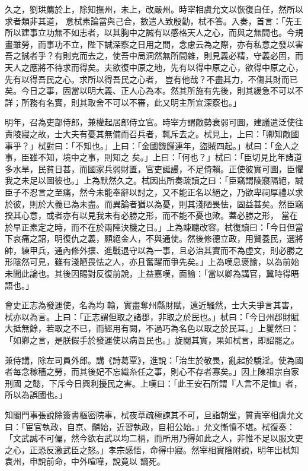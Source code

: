 \begin{pinyinscope}
 久之，劉珙薦於上，除知撫州，未上，改嚴州。時宰相虞允文以恢復自任，然所以求者類非其道，
 意栻素論當與己合，數遣人致殷勤，栻不答。入奏，首言：「先王所以建事立功無不如志者，以其胸中之誠有以感格天人之心，而與之無間也。今規畫雖勞，而事功不立，陛下誠深察之日用之間，念慮云為之際，亦有私意之發以害吾之誠者乎？有則克而去之，使吾中局洞然無所間雜，則見義必精，守義必固，而天人之應將不待求而得矣。夫欲復中原之地，先有以得中原之心，欲得中原之心，先有以得吾民之心。求所以得吾民之心者，
 豈有他哉？不盡其力，不傷其財而已矣。今日之事，固當以明大義、正人心為本。然其所施有先後，則其緩急不可以不詳；所務有名實，則其取舍不可以不審，此又明主所宜深察也。」



 明年，召為吏部侍郎，兼權起居郎侍立官。時宰方謂敵勢衰弱可圖，建議遣泛使往責陵寢之故，士大夫有憂其無備而召兵者，輒斥去之。栻見上，上曰：「卿知敵國事乎？」栻對曰：「不知也。」上曰：「金國饑饉連年，盜賊四起。」栻曰：「金人之事，臣雖不知，境中之事，則知之
 矣。」上曰：「何也？」栻曰：「臣切見比年諸道多水旱，民貧日甚，而國家兵弱財匱，官吏誕謾，不足倚賴。正使彼實可圖，臣懼我之未足以圖彼也。」上為默然久之。栻因出所奏疏讀之曰：「臣竊謂陵寢隔絕，誠臣子不忍言之至痛，然今未能奉辭以討之，又不能正名以絕之，乃欲卑祠厚禮以求於彼，則於大義已為未盡。而異論者猶以為憂，則其淺陋畏怯，固益甚矣。然臣竊揆其心意，或者亦有以見我未有必勝之形，而不能不憂也歟。蓋必勝之形，
 當在於早正素定之時，而不在於兩陣決機之日。」上為竦聽改容。栻復讀曰：「今日但當下哀痛之詔，明復仇之義，顯絕金人，不與通使。然後修德立政，用賢養民，選將帥，練甲兵，通內修外攘、進戰退守以為一事，且必治其實而不為虛文，則必勝之形隱然可見，雖有淺陋畏怯之人，亦且奮躍而爭先矣。」上為嘆息褒諭，以為前始未聞此論也。其後因賜對反復前說，上益嘉嘆，面諭：「當以卿為講官，冀時得晤語也。」



 會史正志為發運使，名為均
 輸，實盡奪州縣財賦，遠近騷然，士大夫爭言其害，栻亦以為言。上曰：「正志謂但取之諸郡，非取之於民也。」栻曰：「今日州郡財賦大抵無餘，若取之不已，而經用有闕，不過巧為名色以取之於民耳。」上矍然曰：「如卿之言，是朕假手於發運使以病吾民也。」旋閱其實，果如栻言，即詔罷之。



 兼侍講，除左司員外郎。講《詩葛覃》，進說：「治生於敬畏，亂起於驕淫。使為國者每念稼穡之勞，而其後妃不忘織糸任之事，則心不存者寡矣。」因上陳祖宗自家刑國
 之懿，下斥今日興利擾民之害。上嘆曰：「此王安石所謂『人言不足恤』者，所以為誤國也。」



 知閣門事張說除簽書樞密院事，栻夜草疏極諫其不可，旦詣朝堂，質責宰相虞允文曰：「宦官執政，自京、黼始，近習執政，自相公始。」允文慚憤不堪。栻復奏：「文武誠不可偏，然今欲右武以均二柄，而所用乃得如此之人，非惟不足以服文吏之心，正恐反激武臣之怒。」孝宗感悟，命得中寢。然宰相實陰附說，明年出栻知袁州，申說前命，中外喧嘩，說竟以
 謫死。




\end{pinyinscope}
